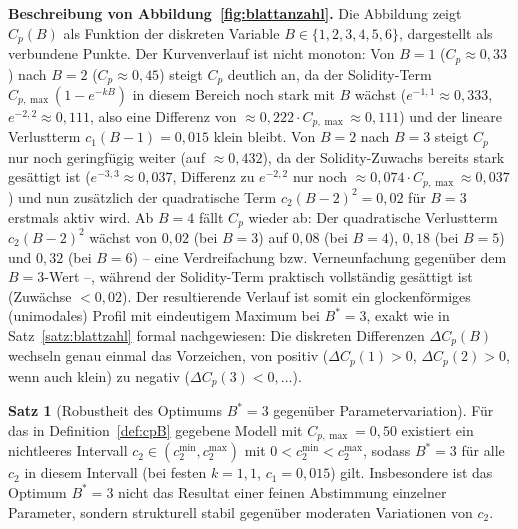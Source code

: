 ﻿\documentclass[a4paper,12pt]{article}
\theoremstyle{definition}
\newtheorem{satz}{Satz}
\begin{document}
\textbf{Beschreibung von Abbildung~\ref{fig:blattanzahl}.}
Die Abbildung zeigt $C_p(B)$ als Funktion der diskreten Variable $B\in\{1,2,3,4,5,6\}$, dargestellt als verbundene Punkte. Der Kurvenverlauf ist nicht monoton: Von $B=1$ ($C_p\approx0{,}33$) nach $B=2$ ($C_p\approx0{,}45$) steigt $C_p$ deutlich an, da der Solidity-Term $C_{p,\max}(1-e^{-kB})$ in diesem Bereich noch stark mit $B$ wächst ($e^{-1{,}1}\approx0{,}333$, $e^{-2{,}2}\approx0{,}111$, also eine Differenz von $\approx0{,}222\cdot C_{p,\max}\approx0{,}111$) und der lineare Verlustterm $c_1(B-1)=0{,}015$ klein bleibt. Von $B=2$ nach $B=3$ steigt $C_p$ nur noch geringfügig weiter (auf $\approx0{,}432$), da der Solidity-Zuwachs bereits stark gesättigt ist ($e^{-3{,}3}\approx0{,}037$, Differenz zu $e^{-2{,}2}$ nur noch $\approx0{,}074\cdot C_{p,\max}\approx0{,}037$) und nun zusätzlich der quadratische Term $c_2(B-2)^2=0{,}02$ für $B=3$ erstmals aktiv wird. Ab $B=4$ fällt $C_p$ wieder ab: Der quadratische Verlustterm $c_2(B-2)^2$ wächst von $0{,}02$ (bei $B=3$) auf $0{,}08$ (bei $B=4$), $0{,}18$ (bei $B=5$) und $0{,}32$ (bei $B=6$) -- eine Verdreifachung bzw. Verneunfachung gegenüber dem $B=3$-Wert --, während der Solidity-Term praktisch vollständig gesättigt ist (Zuwächse $<0{,}02$). Der resultierende Verlauf ist somit ein glockenförmiges (unimodales) Profil mit eindeutigem Maximum bei $B^*=3$, exakt wie in Satz~\ref{satz:blattzahl} formal nachgewiesen: Die diskreten Differenzen $\Delta C_p(B)$ wechseln genau einmal das Vorzeichen, von positiv ($\Delta C_p(1)>0$, $\Delta C_p(2)>0$, wenn auch klein) zu negativ ($\Delta C_p(3)<0,\ldots$).

\begin{satz}[Robustheit des Optimums $B^*=3$ gegenüber Parametervariation]
\label{satz:robustheit_B}
Für das in Definition~\ref{def:cpB} gegebene Modell mit $C_{p,\max}=0{,}50$ existiert ein nichtleeres Intervall $c_2\in(c_2^{\min}, c_2^{\max})$ mit $0<c_2^{\min}<c_2^{\max}$, sodass $B^*=3$ für alle $c_2$ in diesem Intervall (bei festen $k=1{,}1$, $c_1=0{,}015$) gilt. Insbesondere ist das Optimum $B^*=3$ nicht das Resultat einer feinen Abstimmung einzelner Parameter, sondern strukturell stabil gegenüber moderaten Variationen von $c_2$.
\end{satz}
\end{document}
